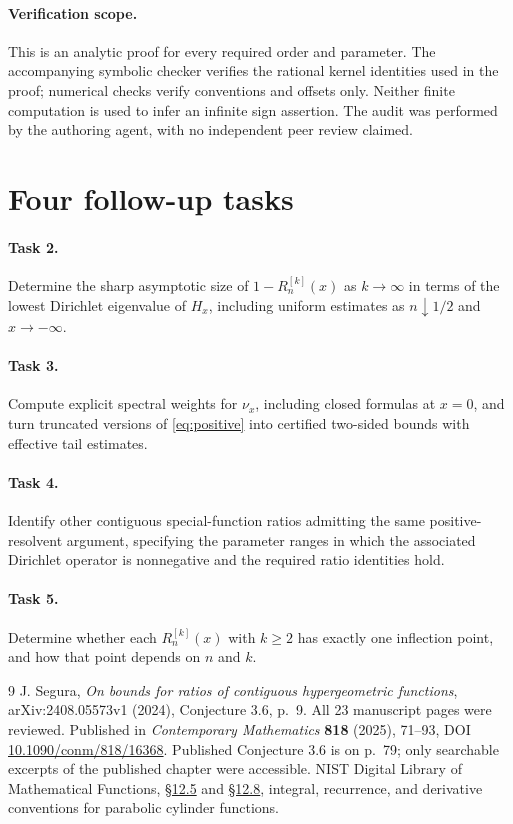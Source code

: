 \documentclass[11pt]{article}
\begin{document}
\paragraph{Verification scope.}
This is an analytic proof for every required order and parameter.
The accompanying symbolic checker verifies the rational kernel identities
used in the proof; numerical checks verify conventions and offsets only.
Neither finite computation is used to infer an infinite sign assertion.
The audit was performed by the authoring agent, with no independent peer
review claimed.

\section*{Four follow-up tasks}
\paragraph{Task 2.}
Determine the sharp asymptotic size of $1-R_n^{[k]}(x)$ as $k\to\infty$
in terms of the lowest Dirichlet eigenvalue of $H_x$, including uniform
estimates as $n\downarrow1/2$ and $x\to-\infty$.
\paragraph{Task 3.}
Compute explicit spectral weights for $\nu_x$, including closed formulas
at $x=0$, and turn truncated versions of \eqref{eq:positive} into certified
two-sided bounds with effective tail estimates.
\paragraph{Task 4.}
Identify other contiguous special-function ratios admitting the same
positive-resolvent argument, specifying the parameter ranges in which the
associated Dirichlet operator is nonnegative and the required ratio
identities hold.
\paragraph{Task 5.}
Determine whether each $R_n^{[k]}(x)$ with $k\ge2$ has exactly one
inflection point, and how that point depends on $n$ and $k$.

\begin{thebibliography}{9}
 J. Segura, \emph{On bounds for ratios of contiguous
hypergeometric functions}, arXiv:2408.05573v1 (2024), Conjecture 3.6,
p.~9. All 23 manuscript pages were reviewed. Published in
\emph{Contemporary Mathematics} \textbf{818} (2025),
71--93, DOI \href{https://doi.org/10.1090/conm/818/16368}
{10.1090/conm/818/16368}. Published Conjecture 3.6 is on p.~79;
only searchable excerpts of the published chapter were accessible.
 NIST Digital Library of Mathematical Functions,
\href{https://dlmf.nist.gov/12.5}{\S12.5} and
\href{https://dlmf.nist.gov/12.8}{\S12.8}, integral, recurrence, and
derivative conventions for parabolic cylinder functions.
\end{thebibliography}
\end{document}
